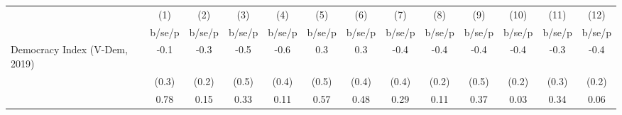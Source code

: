 \begin{tabular}{l*{12}{c}}
\hline\hline
                    &\multicolumn{1}{c}{(1)}&\multicolumn{1}{c}{(2)}&\multicolumn{1}{c}{(3)}&\multicolumn{1}{c}{(4)}&\multicolumn{1}{c}{(5)}&\multicolumn{1}{c}{(6)}&\multicolumn{1}{c}{(7)}&\multicolumn{1}{c}{(8)}&\multicolumn{1}{c}{(9)}&\multicolumn{1}{c}{(10)}&\multicolumn{1}{c}{(11)}&\multicolumn{1}{c}{(12)}\\
                    &      b/se/p&      b/se/p&      b/se/p&      b/se/p&      b/se/p&      b/se/p&      b/se/p&      b/se/p&      b/se/p&      b/se/p&      b/se/p&      b/se/p\\
\hline
Democracy Index (V-Dem, 2019)&        -0.1&        -0.3&        -0.5&        -0.6&         0.3&         0.3&        -0.4&        -0.4&        -0.4&        -0.4&        -0.3&        -0.4\\
                    &       (0.3)&       (0.2)&       (0.5)&       (0.4)&       (0.5)&       (0.4)&       (0.4)&       (0.2)&       (0.5)&       (0.2)&       (0.3)&       (0.2)\\
                    &        0.78&        0.15&        0.33&        0.11&        0.57&        0.48&        0.29&        0.11&        0.37&        0.03&        0.34&        0.06\\
\hline\hline
\end{tabular}
